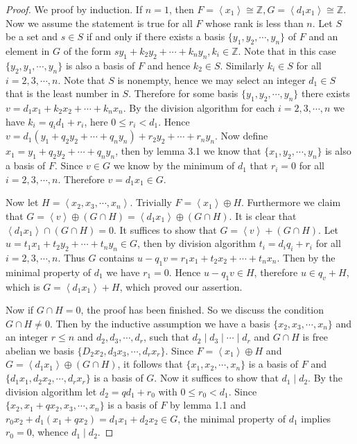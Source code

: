 \begin{proof}
We proof by induction. If $n=1$, then $F=\left<x_1\right>\cong\mathbb{Z},G=\left<d_1x_1\right>\cong\mathbb{Z}$. Now we assume the statement is true for all $F$ whose rank is less than $n$. Let $S$ be a set and $s\in S$ if and only if there exists a basis $\{y_1,y_2,\cdots,y_n\}$ of $F$ and an element in $G$ of the form $sy_1+k_2y_2+\cdots+k_ny_n,k_i\in\mathbb{Z}$. Note that in this case $\{y_2,y_1,\cdots,y_n\}$ is also a basis of $F$ and hence $k_2\in S$. Similarly $k_i\in S$ for all $i=2,3,\cdots,n$. Note that $S$ is nonempty, hence we may select an integer $d_1\in S$ that is the least number in $S$. Therefore for some basis $\{y_1,y_2,\cdots,y_n\}$ there exists $v=d_1x_1+k_2x_2+\cdots+k_nx_n$. By the division algorithm for each $i=2,3,\cdots,n$ we have $k_i=q_id_1+r_i$, here $0\le r_i<d_1$. Hence $v=d_1\left( y_1+q_2y_2+\cdots +q_ny_n \right) +r_2y_2+\cdots +r_ny_n$. Now define $x_1=y_1+q_2y_2+\cdots +q_ny_n$, then by lemma 3.1 we know that $\{x_1,y_2,\cdots,y_n\}$ is also a basis of $F$. Since $v\in G$ we know by the minimum of $d_1$ that $r_i=0$ for all $i=2,3,\cdots,n$. Therefore $v=d_1x_1\in G$.\par
Now let $H=\left<x_2,x_3,\cdots,x_n\right>$. Trivially $F=\left<x_1\right>\oplus H$. Furthermore we claim that $G=\left<v\right>\oplus(G\cap H)=\left<d_1x_1\right>\oplus(G\cap H)$. It is clear that $\left<d_1x_1\right>\cap(G\cap H)=0$. It suffices to show that $G=\left< v \right> +\left( G\cap H \right) $. Let $u=t_1x_1+t_2y_2+\cdots+t_ny_n\in G$, then by division algorithm $t_i=d_iq_i+r_i$ for all $i=2,3,\cdots,n$. Thus $G$ contains $u-q_1v=r_1x_1+t_2x_2+\cdots+t_nx_n$. Then by the minimal property of $d_1$ we have $r_1=0$. Hence $u-q_1v\in H$, therefore $u\in q_v+H$, which is $G=\left<d_1x_1\right>+H$, which proved our assertion.\par
Now if $G\cap H=0$, the proof has been finished. So we discuss the condition $G\cap H\ne 0$. Then by the inductive assumption we have a basis $\{x_2,x_3,\cdots,x_n\}$ and an integer $r\le n$ and $d_2,d_3,\cdots,d_r$, such that $d_2\mid d_3\mid\cdots\mid d_r$ and $G\cap H$ is free abelian we basis $\{D_2x_2,d_3x_3,\cdots,d_rx_r\}$. Since $F=\left<x_1\right>\oplus H$ and $G=\left<d_1x_1\right>\oplus(G\cap H)$, it follows that $\{x_1,x_2,\cdots,x_n\}$ is a basis of $F$ and $\{d_1x_1,d_2x_2,\cdots,d_rx_r\}$ is a basis of $G$. Now it suffices to show that $d_1\mid d_2$. By the division algorithm let $d_2=qd_1+r_0$ with $0\le r_0<d_1$. Since $\{x_2,x_1+qx_2,x_3,\cdots,x_n\}$ is a basis of $F$ by lemma 1.1 and $r_0x_2+d_1(x_1+qx_2)=d_1x_1+d_2x_2\in G$, the minimal property of $d_1$ implies $r_0=0$, whence $d_1\mid d_2$.
\end{proof}
